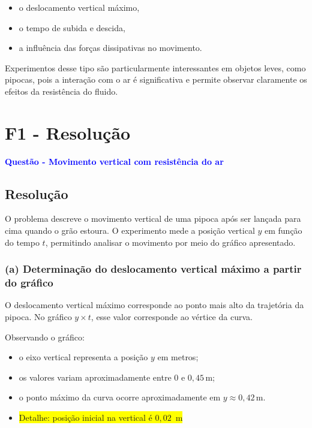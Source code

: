 \documentclass[a4paper,12pt]{article}
\begin{document}
\begin{itemize}
\item o deslocamento vertical máximo,
\item o tempo de subida e descida,
\item a influência das forças dissipativas no movimento.
\end{itemize}

Experimentos desse tipo são particularmente interessantes em objetos leves, como pipocas, pois a interação com o ar é significativa e permite observar claramente os efeitos da resistência do fluido.

\section*{F1 - Resolu\c{c}\~ao}

\textbf{\textcolor{blue}{\Large Quest\~ao - Movimento vertical com resist\^encia do ar}}

\subsection*{Resolu\c{c}\~ao}

O problema descreve o movimento vertical de uma pipoca após ser lançada para cima quando o grão estoura. O experimento mede a posição vertical \(y\) em função do tempo \(t\), permitindo analisar o movimento por meio do gráfico apresentado.

\subsubsection*{(a) Determinação do deslocamento vertical máximo a partir do gráfico}

O deslocamento vertical máximo corresponde ao ponto mais alto da trajetória da pipoca. No gráfico \(y \times t\), esse valor corresponde ao vértice da curva.

Observando o gráfico:

\begin{itemize}
\item o eixo vertical representa a posição \(y\) em metros;
\item os valores variam aproximadamente entre \(0\) e \(0{,}45\,\text{m}\);
\item o ponto máximo da curva ocorre aproximadamente em \(y \approx 0{,}42\,\text{m}\).
\item \colorbox{yellow}{Detalhe: posi\c{c}\~ao inicial na vertical \'e $0{,}02\,$ m }
\end{itemize}
\end{document}
